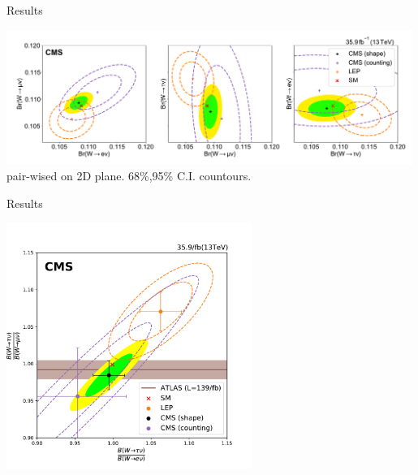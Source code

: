 \begin{frame}{Results}
    \begin{center}
    \includegraphics[width=0.99\textwidth]{chapters/Analysis/sectionResult/figures/result_contours_2d_br.pdf}
    pair-wised \BWl on 2D plane. 68\%,95\% C.I. countours.
    \end{center}
\end{frame}

\begin{frame}{Results}
    \begin{center}
        \includegraphics[width=0.6\textwidth]{chapters/Analysis/sectionResult/figures/result_contours_2d_ratio.pdf}
    \end{center}
\end{frame}




